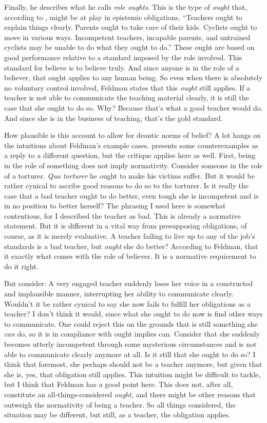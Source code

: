 \documentclass[12pt,numbers=noenddot]{scrartcl}
\begin{document}
Finally, he describes what he calls \emph{role oughts}. This is the type of \emph{ought} that, according to \textcite[676]{Feldman2001-FELVBA}, might be at play in epistemic obligations. “Teachers ought to explain things clearly. Parents ought to take care of their kids. Cyclists ought to move in various ways. Incompetent teachers, incapable parents, and untrained cyclists may be unable to do what they ought to do.” These ought are based on good performance relative to a standard imposed by the role involved. This standard for believe is to believe truly. And since anyone is in the role of a believer, that ought applies to any human being. So even when there is absolutely no voluntary control involved, Feldman states that this \emph{ought} still applies. If a teacher is not able to communicate the teaching material clearly, it is still the case that she ought to do so. Why? Because that's what a good teacher would do. And since she is in the business of teaching, that's the gold standard.

How plausible is this account to allow for deontic norms of belief? A lot hangs on the intuitions about Feldman's example cases.
\textcite[9]{Cote-BouchardForthcoming-CTBCTA} presents some counterexamples as a reply to a different question, but the critique applies here as well. First, being in the role of something does not imply normativity. Consider someone in the role of a torturer. \emph{Qua torturer} he ought to make his victims suffer. But it would be rather cynical to ascribe good reasons to do so to the torturer. Is it really the case that a bad teacher ought to do better, even tough she is incompetent and is in no position to better herself? The phrasing I used here is somewhat contentious, for I described the teacher as bad. This is already a normative statement. But it is different in a vital way from presupposing obligations, of course, as it is merely evaluative. A teacher failing to live up to any of the job's standards is a bad teacher, but \emph{ought} she do better? According to Feldman, that it exactly what comes with the role of believer. It is a normative requirement to do it right.

But consider: A very engaged teacher suddenly loses her voice in a constructed and implausible manner, interrupting her ability to communicate clearly. Wouldn't it be rather cynical to say she now fails to fulfill her obligations as a teacher? I don't think it would, since what she ought to do now is find other ways to communicate. One could reject this on the grounds that is still something she \emph{can} do, so it is in compliance with ought implies can. Consider that she suddenly becomes utterly incompetent through some mysterious circumstances and is not able to communicate clearly anymore at all. Is it still that she ought to do so? I think that foremost, she perhaps should not be a teacher anymore, but given that she is, yes, that obligation still applies. This intuition might be difficult to tackle, but I think that Feldman has a good point here. This does not, after all, constitute an all-things-considered \emph{ought}, and there might be other reasons that outweigh the normativity of being a teacher. So all things considered, the situation may be different, but still, as a teacher, the obligation applies.
\end{document}
